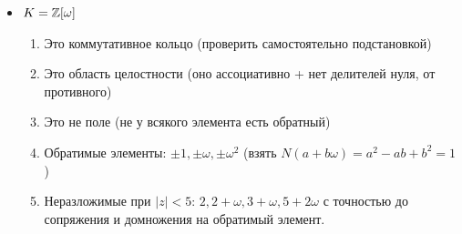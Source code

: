 \begin{itemize}
\item $K = \mathbb{Z}[\omega]$
\begin{enumerate}
    \item Это коммутативное кольцо (проверить самостоятельно подстановкой)
    \item Это область целостности (оно ассоциативно + нет делителей нуля, от противного)
    \item Это не поле (не у всякого элемента есть обратный)
    \item Обратимые элементы: $\pm 1, \pm \omega, \pm \omega^2$ 
    (взять $N(a + b\omega) = a^2 -ab + b^2 = 1$)
    \item Неразложимые при $|z| < 5$: $2, 2 + \omega, 3 + \omega, 5 + 2\omega$ с точностью до сопряжения и домножения на обратимый элемент.
\end{enumerate}

\end{itemize}